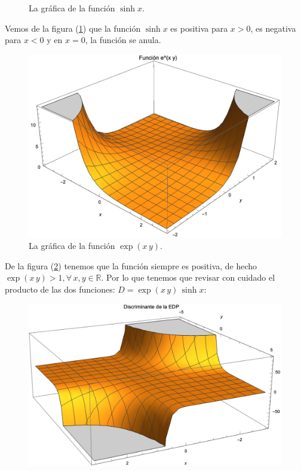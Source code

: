\begin{enumerate}[label=\alph*)]
\begin{figure}[H]
    \caption{La gráfica de la función $\sinh x$.}
    \label{fig:plot_01_sinhx}
\end{figure}
Vemos de la figura (\ref{fig:plot_01_sinhx}) que la función $\sinh x$ es positiva para $x > 0$, es negativa para $x < 0$ y en $x = 0$, la función se anula.
\begin{figure}[H]
    \centering
    \includegraphics[scale=1]{Imagenes/Ejercicio_Plot_02.eps}
    \caption{La gráfica de la función $\exp(x \, y)$.}
    \label{fig:plot_02_exp_xy}
\end{figure}
De la figura (\ref{fig:plot_02_exp_xy}) tenemos que la función siempre es positiva, de hecho $\exp(x \, y) > 1, \forall \, x, y \in \mathbb{R}$. Por lo que tenemos que revisar con cuidado el producto de las dos funciones: $D = \exp(x \, y ) \, \sinh x$:
\begin{figure}[H]
    \centering
    \includegraphics[scale=1]{Imagenes/Ejercicio_Plot_03.eps}

\end{figure}
\end{enumerate}
